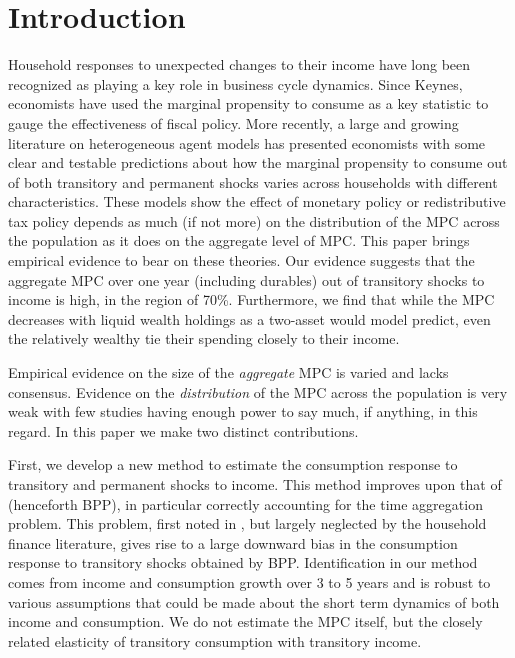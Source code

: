 \documentclass[titlepage]{\econtex}\newcommand{\texname}{IncomeUncertainty}
\begin{document}
\titlepagefinish
\setcounter{page}{1}

\pagebreak
\section{Introduction}

Household responses to unexpected changes to their income have long been recognized as playing a key role in business cycle dynamics. Since Keynes, economists have used the marginal propensity to consume as a key statistic to gauge the effectiveness of fiscal policy. More recently, a large and growing literature on heterogeneous agent models has presented economists with some clear and testable predictions about how the marginal propensity to consume out of both transitory and permanent shocks varies across households with different characteristics. These models show the effect of monetary policy or redistributive tax policy depends as much (if not more) on the distribution of the MPC across the population as it does on the aggregate level of MPC. This paper brings empirical evidence to bear on these theories. Our evidence suggests that the aggregate MPC over one year (including durables) out of transitory shocks to income is high, in the region of 70\%. Furthermore, we find that while the MPC decreases with liquid wealth holdings as a two-asset would model predict, even the relatively wealthy tie their spending closely to their income.

Empirical evidence on the size of the \textit{aggregate} MPC is varied and lacks consensus. Evidence on the \textit{distribution} of the MPC across the population is very weak with few studies having enough power to say much, if anything, in this regard. In this paper we make two distinct contributions.

First, we develop a new method to estimate the consumption response to transitory and permanent shocks to income. This method improves upon that of \cite{blundell_consumption_2008} (henceforth BPP), in particular correctly accounting for the time aggregation problem. This problem, first noted in \cite{working_note_1960}, but largely neglected by the household finance literature, gives rise to a large downward bias in the consumption response to transitory shocks obtained by BPP. Identification in our method comes from income and consumption growth over 3 to 5 years and is robust to various assumptions that could be made about the short term dynamics of both income and consumption. We do not estimate the MPC itself, but the closely related elasticity of transitory consumption with transitory income.
\end{document}
